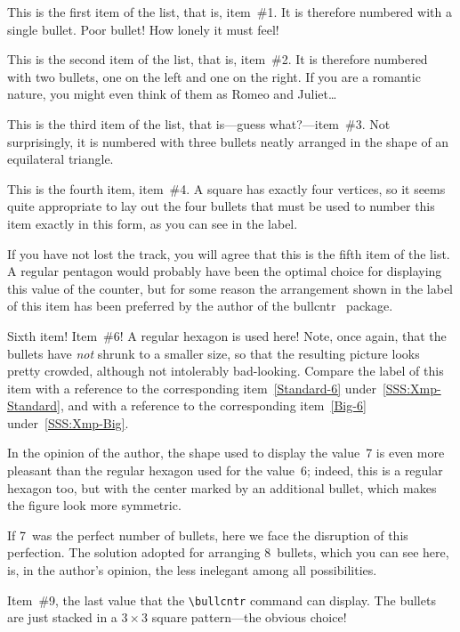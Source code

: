 \documentclass[a4paper]{article}
\DeclareRobustCommand*{\packlass}[1]{%
	{\texorpdfstring{\normalfont \sffamily}{}#1}%
}
\newcommand*{\Bullcntr}{bullcntr}
\newcommand*{\bull}{\packlass{\Bullcntr}}
\newcommand*{\tbull}{the \bull\ package}
\begin{document}
\begin{bullenum}
	\largectrbull

	\item
		This is the first item of the list, that is, item~\#1.  It is
		therefore numbered with a single bullet.  Poor bullet!  How
		lonely it must feel!

	\item
		This is the second item of the list, that is, item~\#2.  It is
		therefore numbered with two bullets, one on the left and one
		on the right.  If you are a romantic nature, you might even
		think of them as Romeo and Juliet\ldots

	\item\label{Large-3}
		This is the third item of the list, that is---guess
		what?---item~\#3.  Not surprisingly, it is numbered with three
		bullets neatly arranged in the shape of an equilateral
		triangle.

	\item
		This is the fourth item, item~\#4.  A square has exactly four
		vertices, so it seems quite appropriate to lay out the four
		bullets that must be used to number this item exactly in this
		form, as you can see in the label.

	\item
		If you have not lost the track, you will agree that this is
		the fifth item of the list.  A regular pentagon would probably
		have been the optimal choice for displaying this value of the
		counter, but for some reason the arrangement shown in the
		label of this item has been preferred by the author of \tbull.

	\item\label{Large-6}
		Sixth item!  Item~\#6!  A regular hexagon is used here!  Note,
		once again, that the bullets have \emph{not} shrunk to a
		smaller size, so that the resulting picture looks pretty
		crowded, although not intolerably bad-looking.  Compare the
		label of this item with a reference to the corresponding
		item~\ref{Standard-6} under~\ref{SSS:Xmp-Standard}, and with a
		reference to the corresponding item~\ref{Big-6}
		under~\ref{SSS:Xmp-Big}.

	\item
		In the opinion of the author, the shape used to display the
		value~7 is even more pleasant than the regular hexagon used
		for the value~6; indeed, this is a regular hexagon too, but
		with the center marked by an additional bullet, which makes
		the figure look more symmetric.

	\item
		If 7~was the perfect number of bullets, here we face the
		disruption of this perfection.  The solution adopted for
		arranging 8~bullets, which you can see here, is, in the
		author's opinion, the less inelegant among all possibilities.

	\item
		Item~\#9, the last value that the \verb|\bullcntr| command can
		display.  The bullets are just stacked in a $3\times3$ square
		pattern---the obvious choice!
\end{bullenum}
\end{document}
